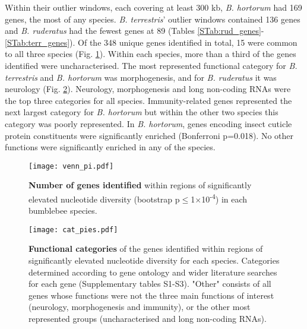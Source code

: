 \documentclass[12pt]{article}
\begin{document}
\begin{linenumbers}
		Within their outlier windows, each covering at least 300 kb, \emph{B. hortorum} had 169 genes, the most of any species. \emph{B. terrestris}' outlier windows contained 136 genes and \emph{B. ruderatus} had the fewest genes at 89 (Tables \ref{STab:rud_genes}-\ref{STab:terr_genes}). Of the 348 unique genes identified in total, 15 were common to all three species (Fig. \ref{fig:venn_pi}). Within each species, more than a third of the genes identified were uncharacterised. The  most represented functional category for \emph{B. terrestris} and \emph{B. hortorum} was morphogenesis, and for \emph{B. ruderatus} it was neurology (Fig. \ref{fig:cat_pies}). Neurology, morphogenesis and long non-coding RNAs were the top three categories for all species. Immunity-related genes represented the next largest category for \emph{B. hortorum} but within the other two species this category was poorly represented. In \emph{B. hortorum}, genes encoding insect cuticle protein constituents were significantly enriched (Bonferroni p=0.018). No other functions were significantly enriched in any of the species.
	
		\begin{figure}[ht!]
			\centering
			\texttt{[image: venn\_pi.pdf]}
			\captionsetup{width=0.88\linewidth}
			\caption{\textbf{Number of genes identified} within regions of significantly elevated nucleotide diversity (bootstrap p$\leq$1$\times$10\textsuperscript{-4}) in each bumblebee species.}
			\label{fig:venn_pi}
		\end{figure}
	

		\begin{figure}[ht!]
			\centering
			\texttt{[image: cat\_pies.pdf]}
			\captionsetup{width=0.88\linewidth}
			\caption{\textbf{Functional categories} of the genes identified within regions of significantly elevated nucleotide diversity for each species. Categories determined according to gene ontology and wider literature searches for each gene (Supplementary tables S1-S3). "Other" consists of all genes whose functions were not the three main functions of interest (neurology, morphogenesis and immunity), or the other most represented groups (uncharacterised and long non-coding RNAs).}
			\label{fig:cat_pies}
		\end{figure}



\end{linenumbers}
\end{document}
